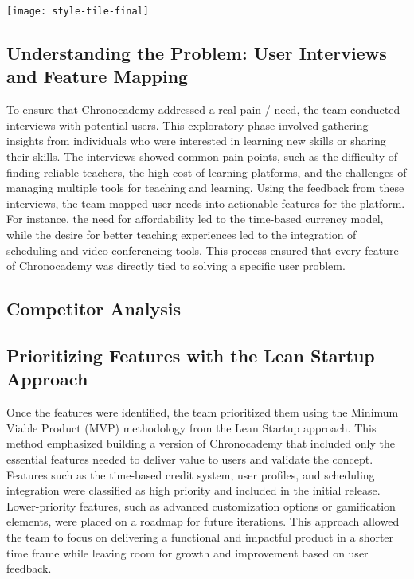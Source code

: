 \texttt{[image: style-tile-final]}\newline

\subsection{Understanding the Problem: User Interviews and Feature Mapping}\label{subsec:user-interviews-feature-mapping}
To ensure that Chronocademy addressed a real pain / need, the team conducted interviews with potential users.
This exploratory phase involved gathering insights from individuals who were interested in learning new skills or sharing their skills.
The interviews showed common pain points, such as the difficulty of finding reliable teachers, the high cost of learning platforms, and the challenges of managing multiple tools for teaching and learning.
Using the feedback from these interviews, the team mapped user needs into actionable features for the platform.
For instance, the need for affordability led to the time-based currency model, while the desire for better teaching experiences led to the integration of scheduling and video conferencing tools.
This process ensured that every feature of Chronocademy was directly tied to solving a specific user problem.

\subsection{Competitor Analysis}\label{subsec:competitor-analysis}

\subsection{Prioritizing Features with the Lean Startup Approach}\label{subsec:prioritizing-features-with-the-lean-startup-approach}
Once the features were identified, the team prioritized them using the Minimum Viable Product (MVP) methodology from the Lean Startup approach.
This method emphasized building a version of Chronocademy that included only the essential features needed to deliver value to users and validate the concept.
Features such as the time-based credit system, user profiles, and scheduling integration were classified as high priority and included in the initial release.
Lower-priority features, such as advanced customization options or gamification elements, were placed on a roadmap for future iterations.
This approach allowed the team to focus on delivering a functional and impactful product in a shorter time frame while leaving room for growth and improvement based on user feedback.